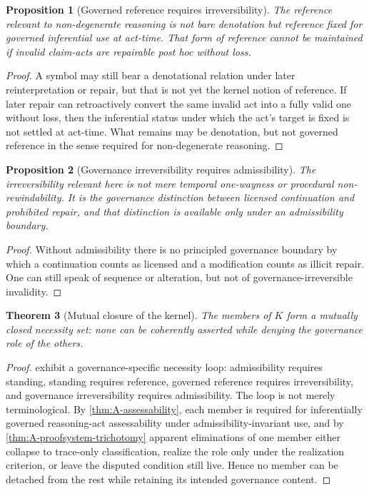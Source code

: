 \documentclass[11pt]{article}
\theoremstyle{plain}
\newtheorem{theorem}{Theorem}[section]
\newtheorem{proposition}[theorem]{Proposition}
\theoremstyle{definition}
\begin{document}
\begin{proposition}[Governed reference requires irreversibility]
\label{prop:A-ref-requires-irr}
The reference relevant to non-degenerate reasoning is not bare denotation but reference fixed for governed inferential use at act-time. That form of reference cannot be maintained if invalid claim-acts are repairable post hoc without loss.
\end{proposition}

\begin{proof}
A symbol may still bear a denotational relation under later reinterpretation or repair, but that is not yet the kernel notion of reference. If later repair can retroactively convert the same invalid act into a fully valid one without loss, then the inferential status under which the act's target is fixed is not settled at act-time. What remains may be denotation, but not governed reference in the sense required for non-degenerate reasoning.
\end{proof}

\begin{proposition}[Governance irreversibility requires admissibility]
\label{prop:A-irr-requires-adm}
The irreversibility relevant here is not mere temporal one-wayness or procedural non-rewindability. It is the governance distinction between licensed continuation and prohibited repair, and that distinction is available only under an admissibility boundary.
\end{proposition}

\begin{proof}
Without admissibility there is no principled governance boundary by which a continuation counts as licensed and a modification counts as illicit repair. One can still speak of sequence or alteration, but not of governance-irreversible invalidity.
\end{proof}

\begin{theorem}[Mutual closure of the kernel]
\label{thm:A-mutual-closure}
The members of $K$ form a mutually closed necessity set: none can be coherently asserted while denying the governance role of the others.
\end{theorem}

\begin{proof}
 exhibit a governance-specific necessity loop: admissibility requires standing, standing requires reference, governed reference requires irreversibility, and governance irreversibility requires admissibility. The loop is not merely terminological. By \cref{thm:A-assessability}, each member is required for inferentially governed reasoning-act assessability under admissibility-invariant use, and by \cref{thm:A-proofsystem-trichotomy} apparent eliminations of one member either collapse to trace-only classification, realize the role only under the realization criterion, or leave the disputed condition still live. Hence no member can be detached from the rest while retaining its intended governance content.
\end{proof}
\end{document}
